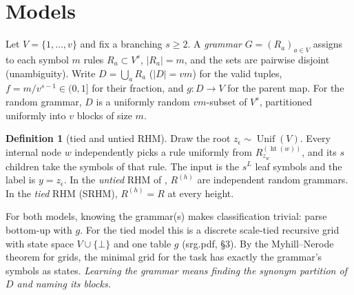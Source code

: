 \documentclass[11pt]{article}
\theoremstyle{definition}
\newtheorem{definition}[theorem]{Definition}
\newcommand{\Unif}{\operatorname{Unif}}
\newcommand{\hgt}{\operatorname{ht}}
\begin{document}
\begin{abstract}
spread over all scales, while an untied top pays the predicted $492/N$ bits per coordinate. About $10^3$
images give the kernel that $5\cdot10^4$ give. A linear head on the root is the Bayes readout, but a
likelihood-trained root holds little class information ($0.30$--$0.38$). The top scale is where CIFAR
stops being self-similar (\S\ref{sec:cifar}). The class information is not lost in the tree but at its
last merge: the four quadrant states give $0.55$, and the hidden types add to the thumbnails at every scale.
Observing labels at the root in the joint likelihood costs at most $H(Y)$ per image in density, and it can
therefore move only what the pixels leave undecided. The root type is already decided by the pixels, so labels add
little ($0.17\to0.25$ with an untied top). An observed label's influence on a node falls about twentyfold per
level on CIFAR, and it bounds the root-label backprop gradient there as well (\S\ref{sec:semtop}).
\end{abstract}

\section{Models}
Let $V=\{1,\dots,v\}$ and fix a branching $s\ge2$. A \emph{grammar} $G=(R_a)_{a\in V}$ assigns to
each symbol $m$ rules $R_a\subset V^s$, $|R_a|=m$, and the sets are pairwise disjoint
(unambiguity). Write $D=\bigcup_aR_a$ ($|D|=vm$) for the valid tuples,
$f=m/v^{s-1}\in(0,1]$ for their fraction, and $g:D\to V$ for the parent map. For the random
grammar, $D$ is a uniformly random $vm$-subset of $V^s$, partitioned uniformly into $v$ blocks
of size $m$.

\begin{definition}[tied and untied RHM]
Draw the root $z_\epsilon\sim\Unif(V)$. Every internal node $w$ independently picks a rule
uniformly from $R^{(\hgt(w))}_{z_w}$, and its $s$ children take the symbols of that rule. The
input is the $s^L$ leaf symbols and the label is $y=z_\epsilon$. In the \emph{untied} RHM of
\cite{cagnetta2024,korchinski2026}, $R^{(h)}$ are independent random grammars. In the
\emph{tied} RHM (SRHM), $R^{(h)}=R$ at every height.
\end{definition}

For both models, knowing the grammar(s) makes classification trivial: parse bottom-up with
$g$. For the tied model this is a discrete scale-tied recursive grid with state space
$V\cup\{\bot\}$ and one table $g$ (srg.pdf, \S3). By the Myhill--Nerode theorem for grids, the
minimal grid for the task has exactly the grammar's symbols as states. \emph{Learning the
grammar means finding the synonym partition of $D$ and naming its blocks.}
\end{document}
